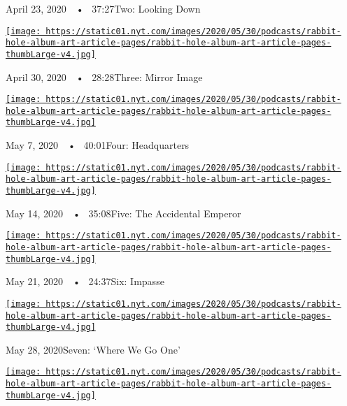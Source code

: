 April 23, 2020~~•~ 37:27Two: Looking Down

\href{https://www.nytimes.com/2020/04/30/podcasts/rabbit-hole-internet-youtube-virus.html?action=click\&module=audio-series-bar\&region=header\&pgtype=Article}{\texttt{[image: https://static01.nyt.com/images/2020/05/30/podcasts/rabbit-hole-album-art-article-pages/rabbit-hole-album-art-article-pages-thumbLarge-v4.jpg]}}

April 30, 2020~~•~ 28:28Three: Mirror Image

\href{https://www.nytimes.com/2020/05/07/podcasts/rabbit-hole-youtube-susan-wojcicki-virus.html?action=click\&module=audio-series-bar\&region=header\&pgtype=Article}{\texttt{[image: https://static01.nyt.com/images/2020/05/30/podcasts/rabbit-hole-album-art-article-pages/rabbit-hole-album-art-article-pages-thumbLarge-v4.jpg]}}

May 7, 2020~~•~ 40:01Four: Headquarters

\href{https://www.nytimes.com/2020/05/14/podcasts/13rabbit-hole-internet-PewDiePie-virus.html?action=click\&module=audio-series-bar\&region=header\&pgtype=Article}{\texttt{[image: https://static01.nyt.com/images/2020/05/30/podcasts/rabbit-hole-album-art-article-pages/rabbit-hole-album-art-article-pages-thumbLarge-v4.jpg]}}

May 14, 2020~~•~ 35:08Five: The Accidental Emperor

\href{https://www.nytimes.com/2020/05/21/podcasts/rabbit-hole-PewDiePie-youtube-virus.html?action=click\&module=audio-series-bar\&region=header\&pgtype=Article}{\texttt{[image: https://static01.nyt.com/images/2020/05/30/podcasts/rabbit-hole-album-art-article-pages/rabbit-hole-album-art-article-pages-thumbLarge-v4.jpg]}}

May 21, 2020~~•~ 24:37Six: Impasse

\href{https://www.nytimes.com/2020/05/28/podcasts/rabbit-hole-qanon-conspiracy-theory-virus.html?action=click\&module=audio-series-bar\&region=header\&pgtype=Article}{\texttt{[image: https://static01.nyt.com/images/2020/05/30/podcasts/rabbit-hole-album-art-article-pages/rabbit-hole-album-art-article-pages-thumbLarge-v4.jpg]}}

May 28, 2020Seven: `Where We Go One'

\href{https://www.nytimes.com/2020/06/04/podcasts/rabbit-hole-qanon-youtube-tiktok-virus.html?action=click\&module=audio-series-bar\&region=header\&pgtype=Article}{\texttt{[image: https://static01.nyt.com/images/2020/05/30/podcasts/rabbit-hole-album-art-article-pages/rabbit-hole-album-art-article-pages-thumbLarge-v4.jpg]}}

